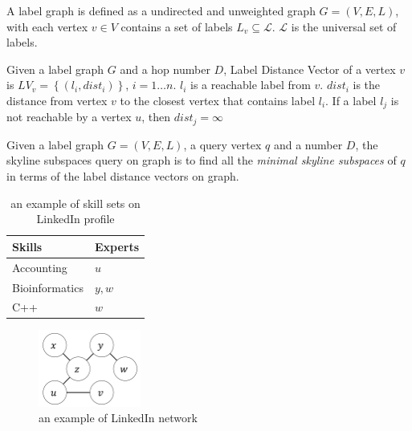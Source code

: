 \begin{definition}
A label graph is defined as a undirected and unweighted graph $G = (V, E, L)$, with each vertex $v \in V$ contains a set of labels $L_v \subseteq \mathcal{L}$. $\mathcal{L}$ is the universal set of labels.
\end{definition}

\begin{definition}
Given a label graph $G$ and a hop number $D$, Label Distance Vector of a vertex $v$ is $LV_v=\left\{\left(l_i, dist_i\right)\right\}$, $i = 1 \ldots n$. $l_i$ is a reachable label from $v$. $dist_i$ is the distance from vertex $v$ to the closest vertex that contains label $l_i$. If a label $l_j$ is not reachable by a vertex $u$, then $dist_j = \infty$
\end{definition}

\begin{definition}
Given a label graph $G = (V, E, L)$, a query vertex $q$ and a number $D$, the skyline subspaces query on graph is to find all the \emph{minimal skyline subspaces} of $q$ in terms of the label distance vectors on graph.
\end{definition}

\begin{table}[h]
    \centering
    \begin{tabular}{|l|l|}
    \hline
    Skills         & Experts \\ \hline
    Accounting     & $u$     \\ \hline
    Bioinformatics & $y, w$  \\ \hline
    C++            & $w$     \\ \hline
    \end{tabular}
    \caption{\label{font-table}an example of skill sets on LinkedIn profile}
    \textbf{\label{tab:skill_sets}\label{tab:skill_sets}}
\end{table}
    
\begin{figure}[h]
    \centering
    \includegraphics[width=0.3\textwidth]{figs/graph_example}
    \caption{\label{font-figure}an example of LinkedIn network}
    \label{fig:graph}
\end{figure}

